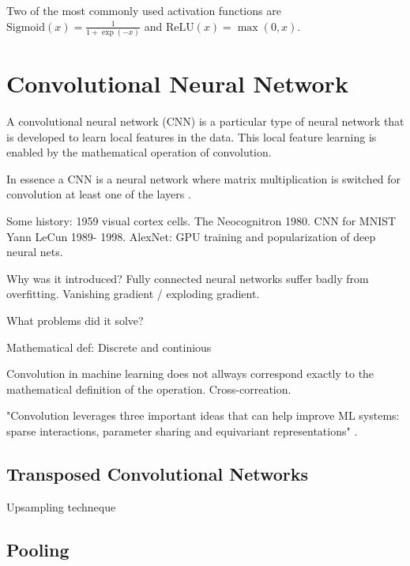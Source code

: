 \documentclass[../../thesis.tex]{subfiles}
\begin{document}
Two of the most commonly used activation functions are $\text{Sigmoid}(x) = \tfrac{1}{1+\exp(-x)}$ and $\text{ReLU}(x) = \max(0,x)$.  




\section{Convolutional Neural Network}

A convolutional neural network (CNN) is a particular type of neural network that is developed to learn local features in the data. This local feature learning is enabled by the mathematical operation of convolution. 

In essence a CNN is a neural network where matrix multiplication is switched for convolution at least one of the layers \cite{deeplearningbook}. 

Some history: 1959 visual cortex cells. The Neocognitron 1980. CNN for MNIST Yann LeCun 1989- 1998. AlexNet: GPU training and popularization of deep neural nets.

Why was it introduced? 
Fully connected neural networks suffer badly from overfitting. Vanishing gradient / exploding gradient.

What problems did it solve?




Mathematical def:
Discrete and continious





Convolution in machine learning does not allways correspond exactly to the mathematical definition of the operation. Cross-correation.




"Convolution leverages three important ideas that can help improve ML systems: sparse interactions, parameter sharing and equivariant representations" \cite{deeplearningbook}.


\subsection{Transposed Convolutional Networks}
Upsampling techneque


\subsection{Pooling}
\end{document}
